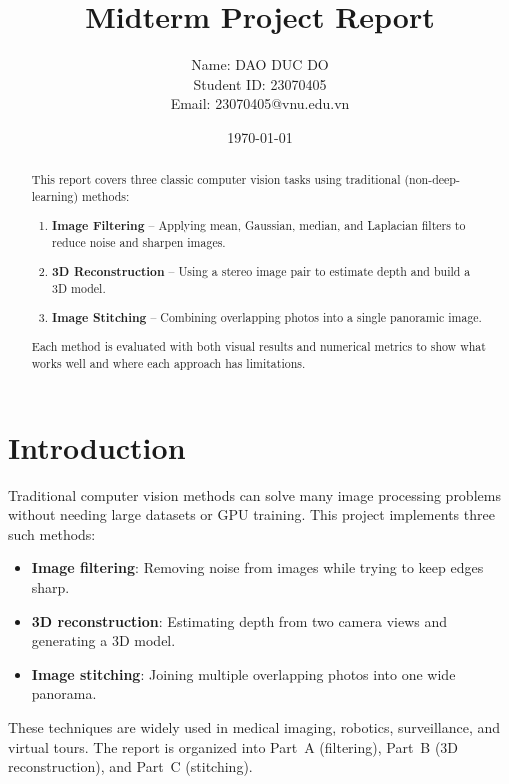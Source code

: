 \documentclass[a4paper,12pt]{article}
\begin{document}
\title{\textcolor{titleblue}{Midterm Project Report}}

\author{\parbox{0.6\linewidth}{\centering
Name: DAO DUC DO\\
Student ID: 23070405\\
Email: 23070405@vnu.edu.vn}}

\date{\today}

\maketitle

\begin{abstract}
This report covers three classic computer vision tasks using traditional (non-deep-learning) methods:
\begin{enumerate}
    \item \textbf{Image Filtering} -- Applying mean, Gaussian, median, and Laplacian filters to reduce noise and sharpen images.
    \item \textbf{3D Reconstruction} -- Using a stereo image pair to estimate depth and build a 3D model.
    \item \textbf{Image Stitching} -- Combining overlapping photos into a single panoramic image.
\end{enumerate}
Each method is evaluated with both visual results and numerical metrics to show what works well and where each approach has limitations.
\end{abstract}

\section{Introduction}

Traditional computer vision methods can solve many image processing problems without needing large datasets or GPU training. This project implements three such methods:

\begin{itemize}
    \item \textbf{Image filtering}: Removing noise from images while trying to keep edges sharp.
    \item \textbf{3D reconstruction}: Estimating depth from two camera views and generating a 3D model.
    \item \textbf{Image stitching}: Joining multiple overlapping photos into one wide panorama.
\end{itemize}

These techniques are widely used in medical imaging, robotics, surveillance, and virtual tours. The report is organized into Part~A (filtering), Part~B (3D reconstruction), and Part~C (stitching).
\end{document}
